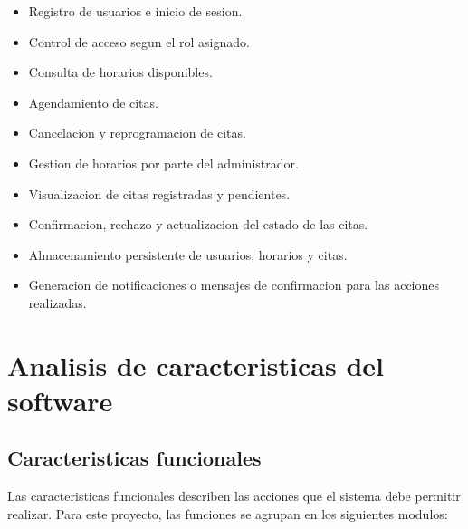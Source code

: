 \documentclass[12pt,letterpaper]{article}
\begin{document}
\begin{itemize}[leftmargin=1.2cm]
    \item Registro de usuarios e inicio de sesion.
    \item Control de acceso segun el rol asignado.
    \item Consulta de horarios disponibles.
    \item Agendamiento de citas.
    \item Cancelacion y reprogramacion de citas.
    \item Gestion de horarios por parte del administrador.
    \item Visualizacion de citas registradas y pendientes.
    \item Confirmacion, rechazo y actualizacion del estado de las citas.
    \item Almacenamiento persistente de usuarios, horarios y citas.
    \item Generacion de notificaciones o mensajes de confirmacion para las acciones realizadas.
\end{itemize}

\section{Analisis de caracteristicas del software}

\subsection{Caracteristicas funcionales}

Las caracteristicas funcionales describen las acciones que el sistema debe permitir realizar. Para este proyecto, las funciones se agrupan en los siguientes modulos:
\end{document}
